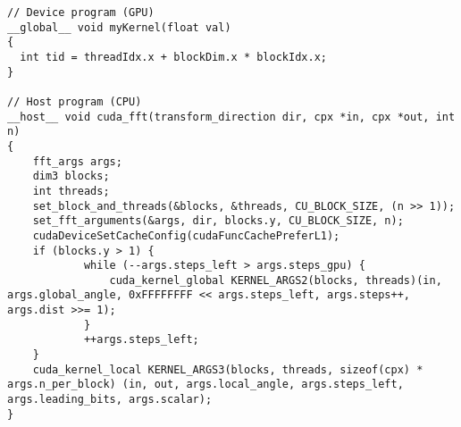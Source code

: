 \lstset{language=C++}
\begin{lstlisting}
// Device program (GPU)
__global__ void myKernel(float val)
{
  int tid = threadIdx.x + blockDim.x * blockIdx.x;
}

// Host program (CPU)
__host__ void cuda_fft(transform_direction dir, cpx *in, cpx *out, int n)
{
    fft_args args;
    dim3 blocks;
    int threads;
    set_block_and_threads(&blocks, &threads, CU_BLOCK_SIZE, (n >> 1));
    set_fft_arguments(&args, dir, blocks.y, CU_BLOCK_SIZE, n);
    cudaDeviceSetCacheConfig(cudaFuncCachePreferL1);
    if (blocks.y > 1) {
            while (--args.steps_left > args.steps_gpu) {
                cuda_kernel_global KERNEL_ARGS2(blocks, threads)(in, args.global_angle, 0xFFFFFFFF << args.steps_left, args.steps++, args.dist >>= 1);
            }
            ++args.steps_left;
    }
    cuda_kernel_local KERNEL_ARGS3(blocks, threads, sizeof(cpx) * args.n_per_block) (in, out, args.local_angle, args.steps_left, args.leading_bits, args.scalar);
}
\end{lstlisting}